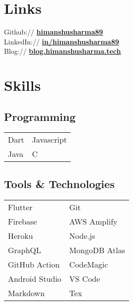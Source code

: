 \documentclass[]{deedy-resume-reversed}
\begin{document}
\begin{minipage}[t]{0.35\textwidth}



\section{Links}
Github:// \href{https://github.com/himanshusharma89}{\bf himanshusharma89} \\
LinkedIn://  \href{https://www.linkedin.com/in/himanshusharma89}{\bf in/himanshusharma89} \\
Blog://  \href{https://blog.himanshusharma.tech/}{\bf blog.himanshusharma.tech}
\sectionsep


\section{Skills}
\subsection{Programming}
\begin{tabular}{ll}
\textbullet{} Dart &\textbullet{} Javascript \\
\textbullet{} Java &\textbullet{} C
\end{tabular}
\sectionsep

\subsection{Tools \& Technologies}
\begin{tabular}{ll}
\textbullet{} Flutter& \textbullet{} Git    \\
\textbullet{} Firebase& \textbullet{} AWS Amplify \\
\textbullet{} Heroku & \textbullet{} Node.js \\
\textbullet{} GraphQL & \textbullet{} MongoDB Atlas    \\
\textbullet{} GitHub Action     & \textbullet{} CodeMagic  \\
\textbullet{} Android Studio & \textbullet{} VS Code \\
\textbullet{} Markdown& \textbullet{} Tex \\
\end{tabular} 
\sectionsep


\end{minipage}
\end{document}
